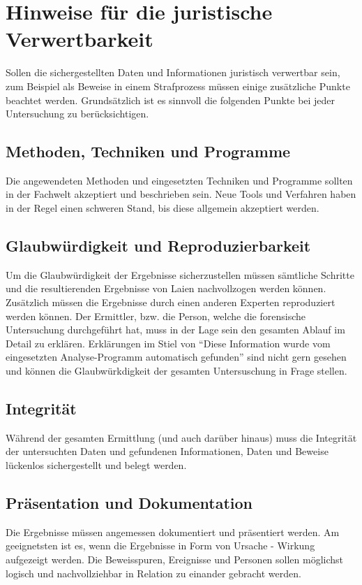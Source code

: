 \section{Hinweise für die juristische Verwertbarkeit}
Sollen die sichergestellten Daten und Informationen juristisch verwertbar sein, zum Beispiel als Beweise in einem Strafprozess müssen einige zusätzliche Punkte beachtet werden. Grundsätzlich ist es sinnvoll die folgenden Punkte bei jeder Untersuchung zu berücksichtigen.

\subsection{Methoden, Techniken und Programme}
Die angewendeten Methoden und eingesetzten Techniken und Programme sollten in der Fachwelt akzeptiert und beschrieben sein. Neue Tools und Verfahren haben in der Regel einen schweren Stand, bis diese allgemein akzeptiert werden.

\subsection{Glaubwürdigkeit und Reproduzierbarkeit}
Um die Glaubwürdigkeit der Ergebnisse sicherzustellen müssen sämtliche Schritte und die resultierenden Ergebnisse von Laien nachvollzogen werden können. Zusätzlich müssen die Ergebnisse durch einen anderen Experten reproduziert werden können. Der Ermittler, bzw. die Person, welche die forensische Untersuchung durchgeführt hat, muss in der Lage sein den gesamten Ablauf im Detail zu erklären. Erklärungen im Stiel von "`Diese Information wurde vom eingesetzten Analyse-Programm automatisch gefunden"' sind nicht gern gesehen und können die Glaubwürkdigkeit der gesamten Untersuschung in Frage stellen.


\subsection{Integrität}
Während der gesamten Ermittlung (und auch darüber hinaus) muss die Integrität der untersuchten Daten und gefundenen Informationen, Daten und Beweise lückenlos sichergestellt und belegt werden. 

\subsection{Präsentation und Dokumentation}
Die Ergebnisse müssen angemessen dokumentiert und präsentiert werden. Am geeignetsten ist es, wenn die Ergebnisse in Form von Ursache - Wirkung aufgezeigt werden. Die Beweisspuren, Ereignisse und Personen sollen möglichst logisch und nachvollziehbar in Relation zu einander gebracht werden.

